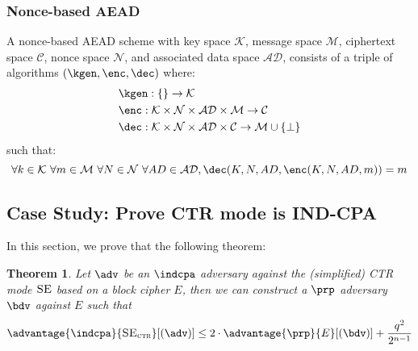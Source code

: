 \documentclass[11pt,a4paper]{article}
\newcommand{\SE}{\textsc{SE}}
\newtheorem{theorem}{Theorem}
\begin{document}
\subsubsection{Nonce-based AEAD}
A nonce-based AEAD scheme with key space $\mathcal{K}$, message space $\mathcal{M}$, ciphertext space $\mathcal{C}$, nonce space $\mathcal{N}$, and associated data space $\mathcal{AD}$, consists of a triple of algorithms $(\kgen, \enc, \dec)$ where:
$$
\begin{aligned}
&\kgen: \{\} \rightarrow \mathcal{K} \\
&\enc: \mathcal{K} \times \mathcal{N} \times \mathcal{AD} \times \mathcal{M} \rightarrow \mathcal{C} \\ 
&\dec: \mathcal{K} \times \mathcal{N} \times \mathcal{AD} \times \mathcal{C}\rightarrow \mathcal{M} \cup \{\bot\}
\end{aligned}
$$
such that: 
$$
\forall k \in \mathcal{K} \ \forall m \in \mathcal{M} \ \forall N \in \mathcal{N} \ \forall AD \in \mathcal{AD}, \dec(K, N, AD, \enc(K,N,AD,m)) = m
$$


\subsection{Case Study: Prove CTR mode is IND-CPA}
In this section, we prove that the following theorem:

\begin{theorem}
Let $\adv$ be an $\indcpa$ adversary against the (simplified) CTR mode $\SE$ based on a block cipher $E$, then we can construct a $\prp$ adversary $\bdv$ against $E$ such that 
$$
\advantage{\indcpa}{\SE_\textsc{ctr}}[(\adv)] \leq 2\cdot \advantage{\prp}{E}[(\bdv)] + \frac{q^2}{2^{n-1}}
$$
\end{theorem}
\end{document}
